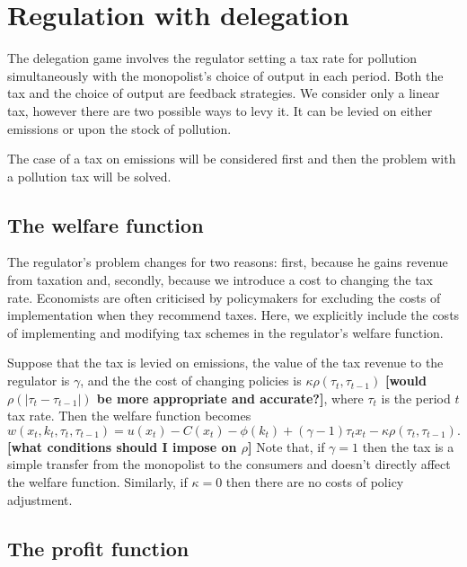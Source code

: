 \documentclass{amsart}
\begin{document}
\section{Regulation with delegation}
\label{sec:regul-with-deleg}

The delegation game involves the regulator setting a tax rate for
pollution simultaneously with the monopolist's choice of output in
each period. Both the tax and the choice of output are feedback
strategies. We consider only a linear tax, however there are two
possible ways to levy it. It can be levied on either emissions or upon
the stock of pollution.

The case of a tax on emissions will be considered first and then the
problem with a pollution tax will be solved.

\subsection{The welfare function}
\label{sec:welfare-function}

The regulator's problem changes for two reasons: first, because he
gains revenue from taxation and, secondly, because we introduce a cost
to changing the tax rate. Economists are often criticised by
policymakers for excluding the costs of implementation when they
recommend taxes. Here, we explicitly include the costs of implementing
and modifying tax schemes in the regulator's welfare function.

Suppose that the tax is levied on emissions, the value of the tax
revenue to the regulator is $\gamma$, and the the cost of changing
policies is $\kappa \rho(\tau_t,\tau_{t-1})$ \textbf{[would
  $\rho\left(\left| \tau_t - \tau_{t-1}\right|\right)$ be more
  appropriate and accurate?]}, where $\tau_t$ is the period $t$ tax
rate. Then the welfare function becomes
\begin{equation}
  \label{eq:30}
  w(x_t,k_t,\tau_t,\tau_{t-1}) = u(x_t) - C(x_t) - \phi(k_t) +
  (\gamma -1)\tau_tx_t - \kappa \rho(\tau_t,\tau_{t-1}).
\end{equation}
\textbf{[what conditions should I impose on $\rho$]}
Note that, if $\gamma=1$ then the tax is a simple transfer
from the monopolist to the consumers and doesn't directly affect the
welfare function. Similarly, if $\kappa=0$ then there are no costs of
policy adjustment.

\subsection{The profit function}
\label{sec:profit-function}
\end{document}
